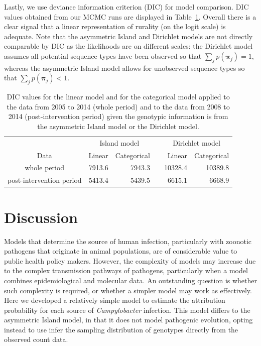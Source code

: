 \documentclass[times, doublespace]{simauth}%
\begin{document}
Lastly, we use deviance information criterion (DIC) for model comparison. DIC values obtained from our MCMC runs are displayed in Table~\ref{tab3}. Overall there is a clear signal that a linear representation of rurality (on the logit scale) is adequate. Note that the asymmetric Island and Dirichlet models are not directly comparable by DIC as the likelihoods are on different scales: the Dirichlet model assumes all potential sequence types have been observed so that $\sum_j p(\boldsymbol{\pi}_j) = 1$, whereas the asymmetric Island model allows for unobserved sequence types so that $\sum_j p(\boldsymbol{\pi}_j) < 1$.

\begin{table}
  \begin{center}
    \begin{tabular}{crrrrr}
      \toprule
      & \multicolumn{2}{c}{Island model}  & \multicolumn{1}{c}{} & \multicolumn{2}{c}{Dirichlet model} \\
      Data & Linear & Categorical & & Linear & Categorical\\ \midrule
      whole period  & 7913.6 & 7943.3  & & 10328.4  & 10389.8 \\
      post-intervention period  & 5413.4  & 5439.5  & & 6615.1   & 6668.9 \\
      \bottomrule
    \end{tabular}
  \end{center}
  \caption{DIC values for the linear model and for the categorical model applied to the data from 2005 to 2014 (whole period) and to the data from 2008 to 2014 (post-intervention period) given the genotypic information is from the asymmetric Island model or the Dirichlet model.}
  \label{tab3}
\end{table}

\section{Discussion}
Models that determine the source of human infection, particularly with zoonotic pathogens that originate in animal populations, are of considerable value to public health policy makers. However, the complexity of models may increase due to the complex transmission pathways of pathogens, particularly when a model combines epidemiological and molecular data. An outstanding question is whether such complexity is required, or whether a simpler model may work as effectively. Here we developed a relatively simple model to estimate the attribution probability for each source of \textit{Campylobacter} infection. This model differs to the asymmetric Island model, in that it does not model pathogenic evolution, opting instead to use infer the sampling distribution of genotypes directly from the observed count data.
\end{document}
